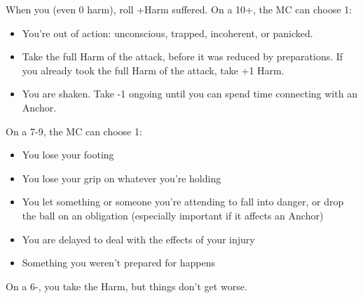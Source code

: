 \begin{multicols}{3}
  \begin{move}
    When you  (even 0 harm), roll +Harm
    suffered. On a 10+, the MC can choose 1:
    \begin{itemize}
      \setlength\itemsep{0em}
    \item You're out of action: unconscious, trapped, incoherent, or
      panicked.
    \item Take the full Harm of the attack, before it was reduced by
      preparations. If you already took the full Harm of the attack, take
      +1 Harm.
    \item You are shaken. Take -1 ongoing until you can spend time
      connecting with an Anchor.
    \end{itemize}
    On a 7-9, the MC can choose 1:
    \begin{itemize}
      \setlength\itemsep{0em}
    \item You lose your footing
    \item You lose your grip on whatever you're holding
    \item You let something or someone you're attending to fall into
      danger, or drop the ball on an obligation (especially important
      if it affects an Anchor)
    \item You are delayed to deal with the effects of your injury
    \item Something you weren't prepared for happens
    \end{itemize}
    On a 6-, you take the Harm, but things don't get worse.
  \end{move}

  \columnbreak
  

\end{multicols}
